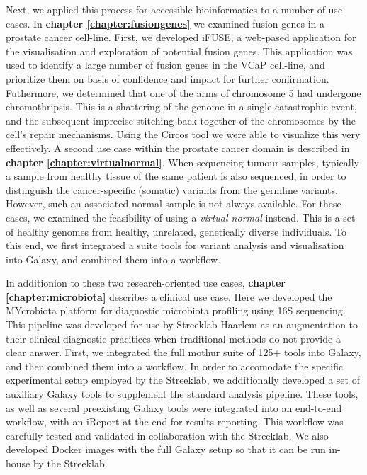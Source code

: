 Next, we applied this process for accessible bioinformatics to a number of use cases. In \textbf{chapter \ref{chapter:fusiongenes}} we examined fusion genes in a prostate cancer cell-line. First, we developed iFUSE, a web-pased application for the visualisation and exploration of potential fusion genes. This application was used to identify a large number of fusion genes in the VCaP cell-line, and prioritize them on basis of confidence and impact for further confirmation. Futhermore, we determined that one of the arms of chromosome 5 had undergone chromothripsis. This is a shattering of the genome in a single catastrophic event, and the subsequent imprecise stitching back together of the chromosomes by the cell's repair mechanisms. Using the Circos tool we were able to visualize this very effectively.
A second use case within the prostate cancer domain is described in \textbf{chapter \ref{chapter:virtualnormal}}. When sequencing tumour samples, typically a sample from healthy tissue of the same patient is also sequenced, in order to distinguish the cancer-specific (somatic) variants from the germline variants. However, such an associated normal sample is not always available. For these cases, we examined the feasibility of using a \emph{virtual normal} instead. This is a set of healthy genomes from healthy, unrelated, genetically diverse individuals. To this end, we first integrated a suite tools for variant analysis and visualisation into Galaxy, and combined them into a workflow.

In additionion to these two research-oriented use cases, \textbf{chapter \ref{chapter:microbiota}} describes a clinical use case. Here we developed the MYcrobiota platform for diagnostic microbiota profiling using 16S sequencing. This pipeline was developed for use by Streeklab Haarlem as an augmentation to their clinical diagnostic pracitices when traditional methods do not provide a clear answer.
First, we integrated the full mothur suite of 125+ tools into Galaxy, and then combined them into a workflow. In order to accomodate the specific experimental setup employed by the Streeklab, we additionally developed a set of auxiliary Galaxy tools to supplement the standard analysis pipeline.
These tools, as well as several preexisting Galaxy tools were integrated into an end-to-end workflow, with an iReport at the end for results reporting. This workflow was carefully tested and validated in collaboration with the Streeklab. We also developed Docker images with the full Galaxy setup so that it can be run in-house by the Streeklab.

